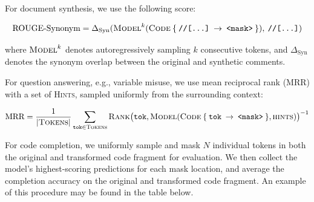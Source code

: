\documentclass[usenames,dvipsnames]{article} %
\begin{document}
  For document synthesis, we use the following score:

  \begin{equation*}
    \text{ROUGE-Synonym} = \Delta_{\text{Syn}}(\textsc{Model}^{k}(\textsc{Code}\:\{\:\texttt{//[...]}\:\rightarrow\:\texttt{<mask>}\:\}), \:\texttt{//[...]})
  \end{equation*}

  where $\textsc{Model}^{k}$ denotes autoregressively sampling $k$ consecutive tokens, and $\Delta_\text{Syn}$ denotes the synonym overlap between the original and synthetic comments.

  For question answering, e.g., variable misuse, we use mean reciprocal rank (MRR) with a set of \textsc{Hints}, sampled uniformly from the surrounding context:

  \begin{equation*}
    \text{MRR} = \frac{1}{|\textsc{Tokens}|} \sum_{\texttt{tok}\in\textsc{Tokens}} \textsc{Rank}\big(\texttt{tok}, \textsc{Model}(\textsc{Code}\:\{\:\texttt{tok}\:\rightarrow\:\texttt{<mask>}\:\}, \textsc{hints})\big)^{-1}
  \end{equation*}


  For code completion, we uniformly sample and mask $N$ individual tokens in both the original and transformed code fragment for evaluation. We then collect the model's highest-scoring predictions for each mask location, and average the completion accuracy on the original and transformed code fragment. An example of this procedure may be found in the table below.
\end{document}
